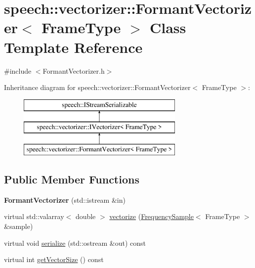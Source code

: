 \hypertarget{classspeech_1_1vectorizer_1_1FormantVectorizer}{\section{speech\+:\+:vectorizer\+:\+:Formant\+Vectorizer$<$ Frame\+Type $>$ Class Template Reference}
\label{classspeech_1_1vectorizer_1_1FormantVectorizer}
}


{\ttfamily \#include $<$Formant\+Vectorizer.\+h$>$}

Inheritance diagram for speech\+:\+:vectorizer\+:\+:Formant\+Vectorizer$<$ Frame\+Type $>$\+:\begin{figure}[H]
\begin{center}
\leavevmode
\includegraphics[height=3.000000cm]{classspeech_1_1vectorizer_1_1FormantVectorizer}
\end{center}
\end{figure}
\subsection*{Public Member Functions}
\begin{DoxyCompactItemize}
\item 
\hypertarget{classspeech_1_1vectorizer_1_1FormantVectorizer_abef2f775e105e837befb8e0f3ed24086}{{\bfseries Formant\+Vectorizer} (std\+::istream \&in)}\label{classspeech_1_1vectorizer_1_1FormantVectorizer_abef2f775e105e837befb8e0f3ed24086}

\item 
virtual std\+::valarray$<$ double $>$ \hyperlink{classspeech_1_1vectorizer_1_1FormantVectorizer_a80e578bcd5f23d4b9237589669e20a1a}{vectorize} (\hyperlink{classspeech_1_1raw__data_1_1FrequencySample}{Frequency\+Sample}$<$ Frame\+Type $>$ \&sample)
\item 
virtual void \hyperlink{classspeech_1_1vectorizer_1_1FormantVectorizer_a8eed42b42272eb0d77a49213a5a36f73}{serialize} (std\+::ostream \&out) const 
\item 
virtual int \hyperlink{classspeech_1_1vectorizer_1_1FormantVectorizer_a50b6e8aeace5dab5f7365b57477b7333}{get\+Vector\+Size} () const 
\end{DoxyCompactItemize}
